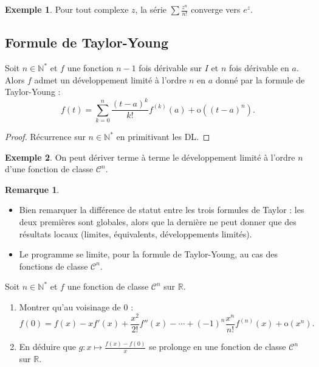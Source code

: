 \documentclass[french]{article}
\newcommand{\N}{\mathbb{N}}
\newcommand{\R}{\mathbb{R}}
\newcommand{\st}{^*}
\renewcommand{\o}{\text{o}}
\theoremstyle{plain}
\theoremstyle{definition}
\newtheorem*{ex}{Exemple}
\newtheorem*{rmq}{Remarque}
\theoremstyle{remark}
\begin{document}
\begin{ex}
	Pour tout complexe $z$, la série $\displaystyle\sum\frac{z^n}{n!}$ converge vers $e^z$.
\end{ex}

\subsection{Formule de Taylor-Young}

\begin{thm}%
	Soit $n\in\N\st$ et $f$ une fonction $n-1$ fois dérivable sur $I$ et $n$ fois dérivable en $a$. Alors $f$ admet un développement limité à l'ordre $n$ en $a$ donné par la formule de Taylor-Young :
	$$f(t)=\sum_{k=0}^{n}\frac{(t-a)^k}{k!}f^{(k)}(a)+\o((t-a)^n).$$
\end{thm}
\begin{proof}
	Récurrence sur $n\in\N\st$ en primitivant les DL.
\end{proof}

\begin{ex}
	On peut dériver terme à terme le développement limité à l'ordre $n$ d'une fonction de classe $\mathcal{C}^n$.
\end{ex}

\begin{rmq}
	\begin{itemize}
		\item Bien remarquer la différence de statut entre les trois formules de Taylor : les deux premières sont globales, alors que la dernière ne peut donner que des résultats locaux (limites, équivalents, développements limités).
		\item Le programme se limite, pour la formule de Taylor-Young, au cas des fonctions de classe $\mathcal{C}^n$.
	\end{itemize}
\end{rmq}

\begin{exo}
	Soit $n\in\N\st$ et $f$ une fonction de classe $\mathcal{C}^n$ sur $\R$.
	\begin{enumerate}
		\item Montrer qu'au voisinage de $0$ :
		$$f(0)=f(x)-xf'(x)+\frac{x^2}{2!}f''(x)-\cdots+(-1)^n\frac{x^n}{n!}f^{(n)}(x)+\o(x^n).$$
		\item En déduire que $g:x\mapsto\displaystyle\frac{f(x)-f(0)}{x}$ se prolonge en une fonction de classe $\mathcal{C}^n$ sur $\R$.
	\end{enumerate}
\end{exo}
\end{document}
